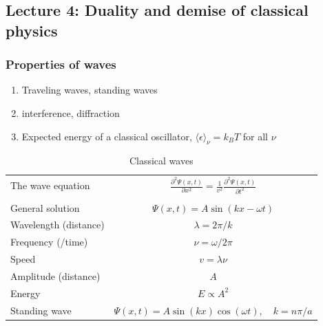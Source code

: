 \documentclass[11pt]{article}
\begin{document}
\subsection{Lecture 4: Duality and demise of classical physics}
\label{sec:orgb828228}
\subsubsection{Properties of waves}
\label{sec:orgcb6ee35}
\begin{enumerate}
\item Traveling waves, standing waves
\item interference, diffraction
\item Expected energy of a classical oscillator, \(\langle \epsilon \rangle _\nu = k_B T\) for all \(\nu\)
\end{enumerate}

\begin{table}
\begin{center}
    \caption{Classical waves}
    \begin{tabular}{|lc|}
     \hline
The wave equation & $\displaystyle \frac{ \partial^2 \Psi(x,t)}{\partial x^2} = \frac{1}{v^2}\frac{\partial^2 \Psi(x,t)}{\partial t^2}$ \\
\\
General solution & \(\Psi(x,t) = A \sin(kx -\omega t)\) \\
Wavelength (distance) & \( \lambda = 2\pi/k \) \\
Frequency (/time) & \( \nu =\omega/2\pi \) \\
Speed & \( v= \lambda \nu \) \\
Amplitude (distance) & \(A\) \\
Energy & \( E \propto A^2 \) \\
Standing wave & \(\Psi(x,t) = A \sin(kx)\cos(\omega t), \quad k =n\pi/a\) \\
\hline
\end{tabular}
\end{center}
\end{table}
\end{document}
